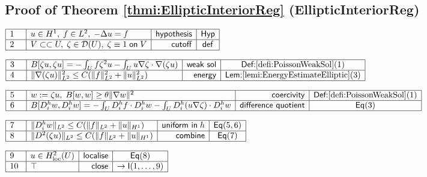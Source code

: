 \documentclass[11pt,reqno]{amsart}
\begin{document}
	\subsection*{Proof of Theorem \protect\ref{thmi:EllipticInteriorReg} (\textsf{EllipticInteriorReg})}
	\noindent$\begin{array}{|m{0.5cm}|l|r|c|}
	\hline
	1 & u\in H^{1},\;f\in L^{2},\;-\Delta u=f & \mathsf{hypothesis} & \mathsf{Hyp} \\ \hline
	2 & V\subset\subset U,\;\zeta\in\mathcal{D}(U),\;\zeta\equiv1\;\mathsf{on}\;V & \mathsf{cutoff} & \mathsf{def} \\ \hline
	\end{array}$
	\par\nointerlineskip\noindent$\begin{array}{|m{0.5cm}|l|r|c|}
	\hline
	3 & B[\zeta u,\zeta u]=-\int_{U}f\zeta^{2}u-\int_{U}u\nabla\zeta\cdot\nabla(\zeta u) & \mathsf{weak\ sol} & \textsf{Def:}\ref{defi:PoissonWeakSol}(1) \\ \hline
	4 & \|\nabla(\zeta u)\|_{L^{2}}^{2}\le C(\|f\|_{L^{2}}^{2}+\|u\|_{L^{2}}^{2}) & \mathsf{energy} & \textsf{Lem:}\ref{lemi:EnergyEstimateElliptic}(3) \\ \hline
	\end{array}$
	\par\nointerlineskip\noindent$\begin{array}{|m{0.5cm}|l|r|c|}
	\hline
	5 & w:=\zeta u,\;B[w,w]\ge\theta\|\nabla w\|^{2} & \mathsf{coercivity} & \textsf{Def:}\ref{defi:PoissonWeakSol}(1) \\ \hline
	6 & B[D_{i}^{h}w,D_{i}^{h}w]=-\int_{U}D_{i}^{h}f\cdot D_{i}^{h}w-\int_{U}D_{i}^{h}(u\nabla\zeta)\cdot D_{i}^{h}w & \mathsf{difference\ quotient} & \mathsf{Eq}(3) \\ \hline
	\end{array}$
	\par\nointerlineskip\noindent$\begin{array}{|m{0.5cm}|l|r|c|}
	\hline
	7 & \|D_{i}^{h}w\|_{L^{2}}\le C(\|f\|_{L^{2}}+\|u\|_{H^{1}}) & \mathsf{uniform\ in}\;h & \mathsf{Eq}(5,6) \\ \hline
	8 & \|D^{2}(\zeta u)\|_{L^{2}}\le C(\|f\|_{L^{2}}+\|u\|_{H^{1}}) & \mathsf{combine} & \mathsf{Eq}(7) \\ \hline
	\end{array}$
	\par\nointerlineskip\noindent$\begin{array}{|m{0.5cm}|l|r|c|}
	\hline
	9 & u\in H_{\mathrm{loc}}^{2}(U) & \mathsf{localise} & \mathsf{Eq}(8) \\ \hline
	10 & \top & \mathsf{close} & \to\mathsf{I}(1,\dots,9) \\ \hline
	\end{array}$
	\medskip
	
\end{document}
